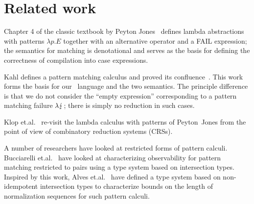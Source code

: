 
\section{Related work}

Chapter 4 of the classic textbook by Peyton Jones~\cite{spj_1987}
defines lambda abstractions with patterns $\lambda p.E$ together with
an alternative operator and a FAIL expression; the semantics for
matching is denotational and serves as the basis for defining the
correctness of compilation into case expressions.

Kahl defines a pattern matching calculus and proved its
confluence~\cite{kahl_2004}. This work forms the basis for our
\lambdaPMC\ language and the two semantics. The principle difference
is that we do not consider the ``empty expression'' corresponding to a
pattern matching failure $\lambda\lightning$; there is simply no
reduction in such cases.

Klop et.\@ al.\@~\cite{KLOP200816} re-visit the lambda calculus with
patterns of Peyton~Jones from the point of view of combinatory
reduction systems (CRSs).

A number of researchers have looked at restricted forms of pattern
calculi.  Bucciarelli et.\@ al.\@~\cite{bucciarelli_et_al_2015} have
looked at characterizing observability for pattern matching restricted
to pairs using a type system based on intersection types.  Inspired by
this work, Alves et.\@ al.\@~\cite{alves_et_al_2020} have defined a type system based on
non-idempotent intersection types to characterize bounds on the length
of normalization sequences for such pattern
calculi.


